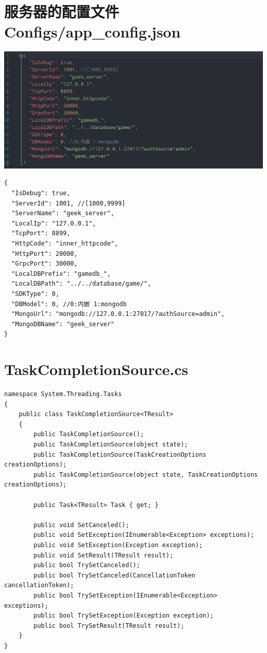 \documentclass[9pt, b5paper]{article}
\begin{document}
\section{服务器的配置文件 Configs/app\_config.json}
\label{sec:org5ae68e7}

\begin{center}
\includegraphics[width=.9\linewidth]{./pic/readme_20230101_180011.png}
\end{center}
\begin{verbatim}
{
  "IsDebug": true,
  "ServerId": 1001, //[1000,9999]
  "ServerName": "geek_server",
  "LocalIp": "127.0.0.1",
  "TcpPort": 8899,
  "HttpCode": "inner_httpcode",
  "HttpPort": 20000,
  "GrpcPort": 30000,
  "LocalDBPrefix": "gamedb_",
  "LocalDBPath": "../../database/game/",
  "SDKType": 0,
  "DBModel": 0, //0:内嵌 1:mongodb
  "MongoUrl": "mongodb://127.0.0.1:27017/?authSource=admin",
  "MongoDBName": "geek_server"
}
\end{verbatim}

\section{TaskCompletionSource.cs}
\label{sec:org789b91e}
\begin{verbatim}
namespace System.Threading.Tasks
{
    public class TaskCompletionSource<TResult>
    {
        public TaskCompletionSource();
        public TaskCompletionSource(object state);
        public TaskCompletionSource(TaskCreationOptions creationOptions);
        public TaskCompletionSource(object state, TaskCreationOptions creationOptions);

        public Task<TResult> Task { get; }

        public void SetCanceled();
        public void SetException(IEnumerable<Exception> exceptions);
        public void SetException(Exception exception);
        public void SetResult(TResult result);
        public bool TrySetCanceled();
        public bool TrySetCanceled(CancellationToken cancellationToken);
        public bool TrySetException(IEnumerable<Exception> exceptions);
        public bool TrySetException(Exception exception);
        public bool TrySetResult(TResult result);
    }
}  
\end{verbatim}
\end{document}
